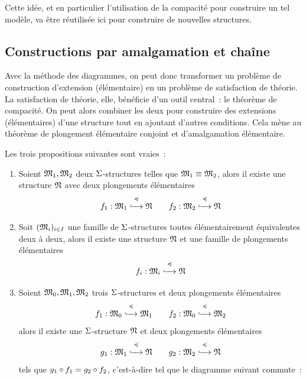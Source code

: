 Cette idée, et en particulier l'utilisation de la compacité pour construire
un tel modèle, va être réutilisée ici pour construire de nouvelles structures.

\subsection{Constructions par amalgamation et chaîne}

Avec la méthode des diagrammes, on peut donc transformer un problème de
construction d'extension (élémentaire) en un problème de satisfaction de
théorie. La satisfaction de théorie, elle, bénéficie d'un outil central~: le
théorème de compacité. On peut alors combiner les deux pour construire des
extensions (élémentaires) d'une structure tout en ajoutant d'autres conditions.
Cela mène au théorème de plongement élémentaire conjoint et d'amalgamation
élémentaire.

\begin{theorem}\label{thm.amalgamation}
  Les trois propositions suivantes sont vraies~:
  \begin{enumerate}[label=(\roman*)]
  \item Soient $\mathfrak{M}_1,\mathfrak{M}_2$ deux $\Sigma$-structures telles que
    $\mathfrak{M}_1\equiv\mathfrak{M}_2$, alors il existe une structure $\mathfrak{N}$ avec
    deux plongements élémentaires
    \[f_1 : \displaystyle \mathfrak{M}_1 \overset{\preccurlyeq}{\xhookrightarrow{\quad}} \mathfrak{N}\qquad
    f_2 : \displaystyle \mathfrak{M}_2 \overset{\preccurlyeq}{\xhookrightarrow{\quad}} \mathfrak{N}\]
  \item Soit $(\mathfrak{M}_i)_{i \in I}$ une famille de $\Sigma$-structures toutes
    élémentairement équivalentes deux à deux, alors il existe une structure
    $\mathfrak{N}$ et une famille de plongements élémentaires
    \[f_i : \displaystyle \mathfrak{M}_i \overset{\preccurlyeq}{\xhookrightarrow{\quad}} \mathfrak{N}\]
  \item Soient $\mathfrak{M}_0,\mathfrak{M}_1,\mathfrak{M}_2$ trois $\Sigma$-structures et deux
    plongements élémentaires
    \[f_1 : \displaystyle \mathfrak{M}_0 \overset{\preccurlyeq}{\xhookrightarrow{\quad}} \mathfrak{M}_1\qquad
    f_2 : \displaystyle \mathfrak{M}_0 \overset{\preccurlyeq}{\xhookrightarrow{\quad}} \mathfrak{M}_2\]
    alors il existe une $\Sigma$-structure $\mathfrak{N}$ et deux plongements
    élémentaires
    \[g_1 : \displaystyle \mathfrak{M}_1 \overset{\preccurlyeq}{\xhookrightarrow{\quad}} \mathfrak{N}\qquad
    g_2 : \displaystyle \mathfrak{M}_2 \overset{\preccurlyeq}{\xhookrightarrow{\quad}} \mathfrak{N}\]
    tels que $g_1\circ f_1 = g_2\circ f_2$,
    c'est-à-dire tel que le diagramme suivant commute~:
    \begin{center}
    \end{center}
  \end{enumerate}
\end{theorem}

